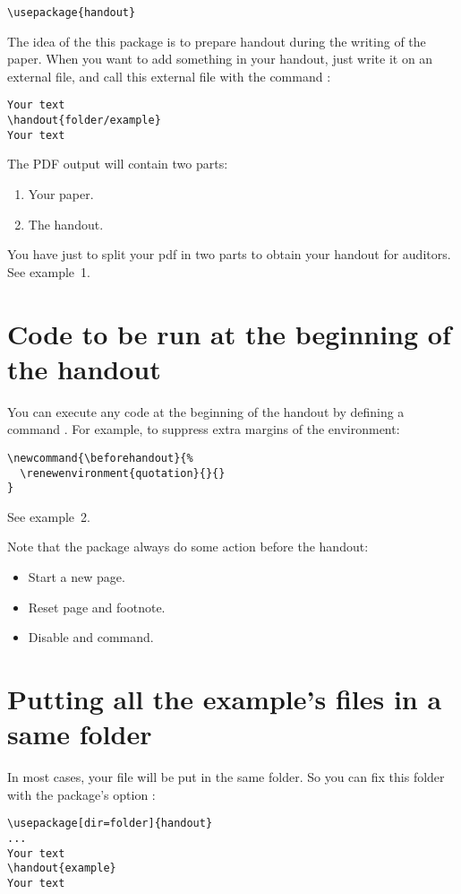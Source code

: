 \documentclass{ltxdockit}[2011/03/25]
\begin{document}
\begin{verbatim}
\usepackage{handout}
\end{verbatim}
The idea of the this package is to prepare handout during the writing of the paper. When you want to add something in your handout, just write it on an external file, and call this external file with the command  :

\begin{verbatim}
Your text
\handout{folder/example}
Your text
\end{verbatim}

The PDF output will contain two parts:
\begin{enumerate}
  \item Your paper.
  \item The handout.
\end{enumerate}

You have just to split your pdf in two parts to obtain your handout for auditors.
See example~1.

\section{Code to be run at the beginning of the handout}

You can execute any code at the beginning of the handout by defining a command . For example, to suppress extra margins of the  environment:
\begin{verbatim}
\newcommand{\beforehandout}{%
  \renewenvironment{quotation}{}{}
}
\end{verbatim}
See example~2.

Note that the package always do some action before the handout:
\begin{itemize}
  \item Start a new page.
  \item Reset page and footnote.
  \item Disable  and  command.
\end{itemize}
\section{Putting all the example's files in a same folder}

In most cases, your file will be put in the same folder. So you can fix this folder with the package's option :
\begin{verbatim}
\usepackage[dir=folder]{handout}
...
Your text
\handout{example}
Your text
\end{verbatim}
\end{document}
